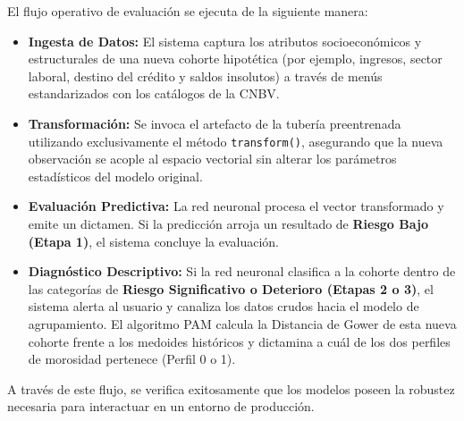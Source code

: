 El flujo operativo de evaluación se ejecuta de la siguiente manera:
\begin{itemize}
	\item \textbf{Ingesta de Datos:} El sistema captura los atributos socioeconómicos y estructurales de una nueva cohorte hipotética (por ejemplo, ingresos, sector laboral, destino del crédito y saldos insolutos) a través de menús estandarizados con los catálogos de la CNBV.
	\item \textbf{Transformación:} Se invoca el artefacto de la tubería preentrenada utilizando exclusivamente el método \texttt{transform()}, asegurando que la nueva observación se acople al espacio vectorial sin alterar los parámetros estadísticos del modelo original.
	\item \textbf{Evaluación Predictiva:} La red neuronal procesa el vector transformado y emite un dictamen. Si la predicción arroja un resultado de \textbf{Riesgo Bajo (Etapa 1)}, el sistema concluye la evaluación.
	\item \textbf{Diagnóstico Descriptivo:} Si la red neuronal clasifica a la cohorte dentro de las categorías de \textbf{Riesgo Significativo o Deterioro (Etapas 2 o 3)}, el sistema alerta al usuario y canaliza los datos crudos hacia el modelo de agrupamiento. El algoritmo PAM calcula la Distancia de Gower de esta nueva cohorte frente a los medoides históricos y dictamina a cuál de los dos perfiles de morosidad pertenece (Perfil 0 o 1).
\end{itemize}

A través de este flujo, se verifica exitosamente que los modelos poseen la robustez necesaria para interactuar en un entorno de producción.